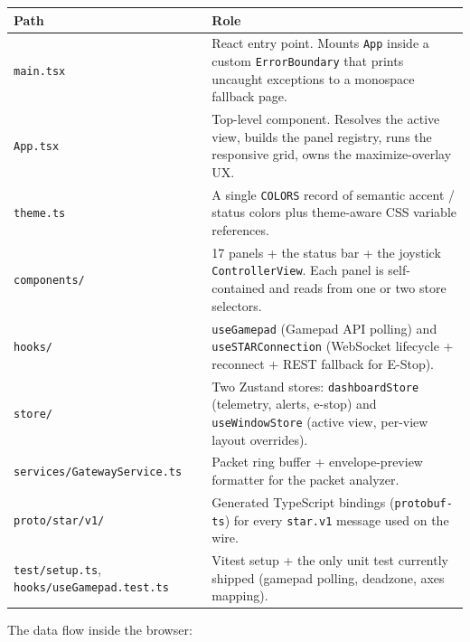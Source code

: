 \begin{center}
\begin{tabular}{|p{3.6cm}|p{11.2cm}|}
\hline
\textbf{Path}                    & \textbf{Role}                                                                                                                              \\
\hline
\texttt{main.tsx}                & React entry point. Mounts \texttt{App} inside a custom \texttt{ErrorBoundary} that prints uncaught exceptions to a monospace fallback page. \\
\texttt{App.tsx}                 & Top-level component. Resolves the active view, builds the panel registry, runs the responsive grid, owns the maximize-overlay UX.            \\
\texttt{theme.ts}                & A single \texttt{COLORS} record of semantic accent / status colors plus theme-aware CSS variable references.                                  \\
\texttt{components/}             & 17 panels + the status bar + the joystick \texttt{ControllerView}. Each panel is self-contained and reads from one or two store selectors.   \\
\texttt{hooks/}                  & \texttt{useGamepad} (Gamepad API polling) and \texttt{useSTARConnection} (WebSocket lifecycle + reconnect + REST fallback for E-Stop).        \\
\texttt{store/}                  & Two Zustand stores: \texttt{dashboardStore} (telemetry, alerts, e-stop) and \texttt{useWindowStore} (active view, per-view layout overrides). \\
\texttt{services/GatewayService.ts} & Packet ring buffer + envelope-preview formatter for the packet analyzer.                                                                  \\
\texttt{proto/star/v1/}          & Generated TypeScript bindings (\texttt{protobuf-ts}) for every \texttt{star.v1} message used on the wire.                                    \\
\texttt{test/setup.ts}, \texttt{hooks/useGamepad.test.ts} & Vitest setup + the only unit test currently shipped (gamepad polling, deadzone, axes mapping).                          \\
\hline
\end{tabular}
\end{center}

The data flow inside the browser:

